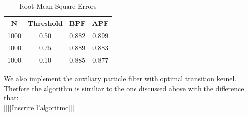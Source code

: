 \documentclass[
]{book}
\theoremstyle{break}
\theoremstyle{nonumberplain}
\begin{document}
\begin{longtable}[t]{cccc}
\caption{\label{tab:unnamed-chunk-22}Root Mean Square Errors}\\
\toprule
N & Threshold & BPF & APF\\
\midrule
1000 & 0.50 & 0.882 & 0.899\\
1000 & 0.25 & 0.889 & 0.883\\
1000 & 0.10 & 0.885 & 0.877\\
\bottomrule
\end{longtable}

We also implement the auxiliary particle filter with optimal transition
kernel. Therfore the algorithm is similiar to the one discussed above
with the difference that:\\
{[}{[}{[}{[}Inserire l'algoritmo{]}{]}{]}{]}
\end{document}
